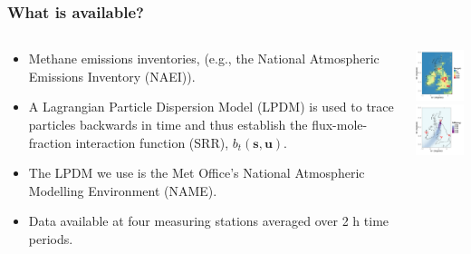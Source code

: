 \documentclass{beamer}
\newcommand{\svec} {\textbf{s}}
\newcommand{\uvec} {\textbf{u}}
\begin{document}
\begin{frame}
\frametitle{What is available?}

\begin{columns}[T]
\begin{column}{0.6\textwidth}
\small
  \begin{itemize}
  \item Methane emissions inventories, (e.g., the National Atmospheric Emissions Inventory (NAEI)).\vfill
  \item A Lagrangian Particle Dispersion Model (LPDM) is used to trace particles backwards in time and thus establish the flux-mole-fraction interaction function (SRR), $b_t(\svec,\uvec)$.\vfill
  \item The LPDM we use is the Met Office's National Atmospheric Modelling Environment (NAME).\vfill
  \item Data available at four measuring stations averaged over 2 h time periods.\vfill
  \end{itemize}
\end{column}
\hfill
\begin{column}{0.33\textwidth}

\includegraphics[width=1.4in]{NAEI.png} \\
\includegraphics[width=1.4in]{TTA_01_01.png}


\end{column}
\end{columns}
\end{frame}




\end{document}
